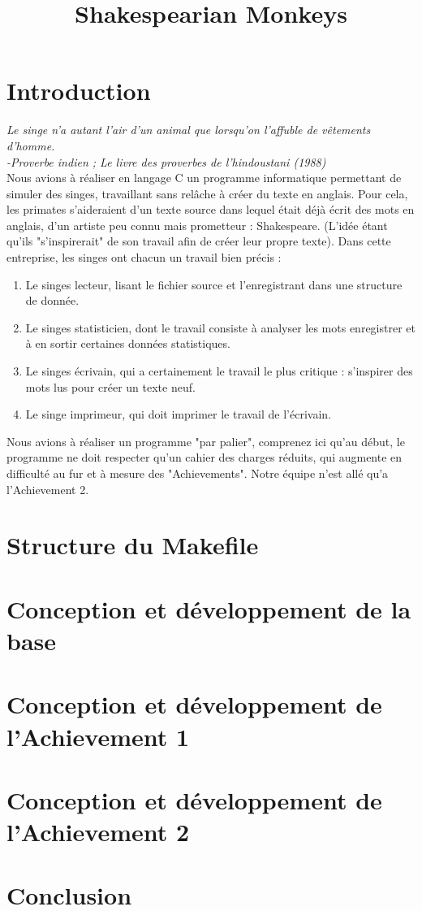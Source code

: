 \documentclass{article}
\title{Shakespearian Monkeys}
\begin{document}
\titlepage

\tableofcontents

\section{Introduction}

\emph{Le singe n’a autant l'air d'un animal que lorsqu'on l'affuble de vêtements d'homme.\\
-Proverbe indien ; Le livre des proverbes de l'hindoustani (1988)}\\

Nous avions à réaliser en langage C un programme informatique permettant de simuler des singes, travaillant sans relâche à créer du texte en anglais.
Pour cela, les primates s'aideraient d'un texte source dans lequel était déjà écrit des mots en anglais, d'un artiste peu connu mais prometteur : Shakespeare. (L'idée étant qu'ils "s'inspirerait" de son travail afin de créer leur propre texte). Dans cette entreprise, les singes ont chacun un travail bien précis :
\begin{enumerate}
    \item Le singes lecteur, lisant le fichier source et l'enregistrant dans une structure de donnée.
    \item Le singes statisticien, dont le travail consiste à analyser les mots enregistrer et à en sortir certaines données statistiques.
    \item Le singes écrivain, qui a certainement le travail le plus critique : s'inspirer des mots lus pour créer un texte neuf.
    \item Le singe imprimeur, qui doit imprimer le travail de l'écrivain.
\end{enumerate}

Nous avions à réaliser un programme "par palier", comprenez ici qu'au début, le programme ne doit respecter qu'un cahier des charges réduits, qui augmente en difficulté au fur et à mesure des "Achievements". Notre équipe n'est allé qu'a l'Achievement 2. 


\newpage

\section{Structure du Makefile}

\section{Conception et développement de la base}

\section{Conception et développement de l'Achievement 1}

\section{Conception et développement de l'Achievement 2}

\section{Conclusion}
\end{document}
